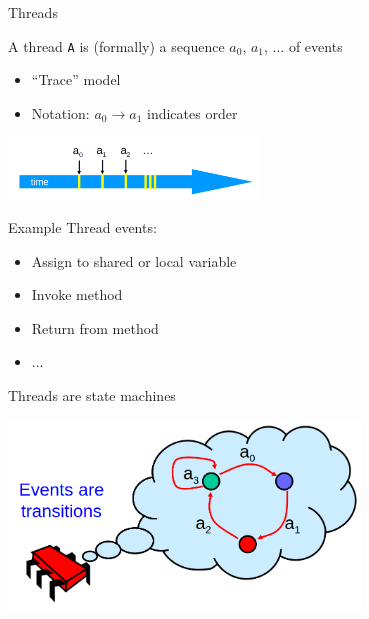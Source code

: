 \begin{frame}[fragile, t]{Threads}

A thread \texttt{A} is (formally) a sequence $a_0$, $a_1$, ... of events 
\begin{itemize}
  \item “Trace” model
  \item Notation: $a_0 \rightarrow a_1$ indicates order
\end{itemize}

\begin{center}
  \includegraphics[width=0.5\textwidth]{./pics/time/ThreadTrace.png}
\end{center}

\pause
Example Thread events:
\begin{itemize}
  \item Assign to shared or local variable
  \item Invoke method
  \item Return from method
  \item ...
\end{itemize}

\end{frame}

\begin{frame}[fragile, t]{Threads are state machines}

\begin{center}
  \includegraphics[width=0.7\textwidth]{./pics/time/ThreadsStateMachines.png}
\end{center}

\end{frame}


